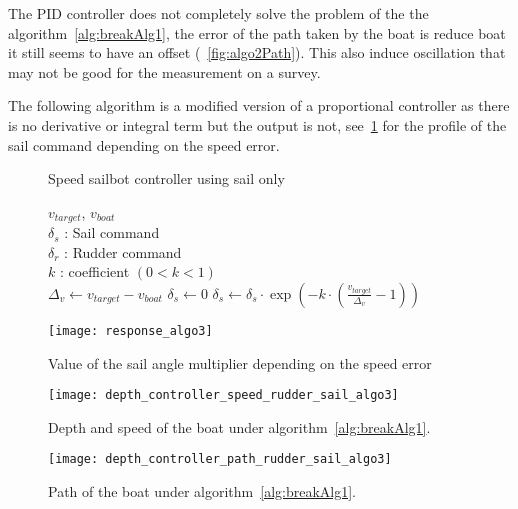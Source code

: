 The PID controller does not completely solve the problem of the the algorithm~\ref{alg:breakAlg1}, the error of the path taken by the boat is reduce boat  it still seems to have an offset (~\ref{fig:algo2Path}). This also induce oscillation that may not be good for the measurement on a survey.

The following algorithm is a modified version of a proportional controller as there is no derivative or integral term but the output is not, see~\ref{fig:responAlgo3} for the profile of the sail command depending on the speed error.

\begin{figure}[H]
\centering
    \begin{minipage}[b]{0.4\textwidth}
    \begin{algorithm}[H]
\caption{Speed sailbot controller using sail only}
\label{alg:breakAlg3}
\begin{algorithmic}[1]
\REQUIRE $v_{target}$, $v_{boat}$\\
   $\delta_s$ : Sail command\\
   $\delta_r$ : Rudder command\\
   $k$ : coefficient $(0< k <1)$\\
\STATE $\Delta_{v} \leftarrow v_{target} - v_{boat}$
\STATE $\delta_s \leftarrow 0$
\ELSE
\STATE $\delta_s \leftarrow \delta_s \cdot  \exp(-k \cdot (\frac{v_{target}}{\Delta_v}-1)) $
\ENDIF
\end{algorithmic}
\end{algorithm}
    \end{minipage}
    \hfill
    \begin{minipage}[b]{0.45\textwidth}
    \centering
    \texttt{[image: response\_algo3]}
    \caption{Value of the sail angle multiplier depending on the speed error }
    \label{fig:responAlgo3}
    \end{minipage}
\end{figure}




\begin{figure}[H]
\centering
    \begin{minipage}[b]{0.4\textwidth}
    \centering
    \texttt{[image: depth\_controller\_speed\_rudder\_sail\_algo3]}
    \caption{Depth and speed of the boat under algorithm~\ref{alg:breakAlg1}.}
    \label{fig: algo3Depth}
    \end{minipage}
    \hfill
    \begin{minipage}[b]{0.45\textwidth}
    \centering
    \texttt{[image: depth\_controller\_path\_rudder\_sail\_algo3]}
    \caption{Path of the boat under algorithm~\ref{alg:breakAlg1}.}
    \label{fig:algo3Path}
    \end{minipage}
\end{figure}


